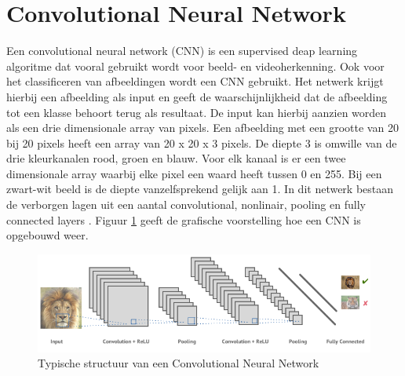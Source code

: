 \section{Convolutional Neural Network}
\label{sec:Convolutional Neural Network}

Een convolutional neural network (\acrshort{CNN}) is een supervised deap learning algoritme dat vooral gebruikt wordt voor beeld- en videoherkenning. Ook voor het classificeren van afbeeldingen wordt een CNN gebruikt. Het netwerk krijgt hierbij een afbeelding als input en geeft de waarschijnlijkheid dat de afbeelding tot een klasse behoort terug als resultaat. De input kan hierbij aanzien worden als een drie dimensionale array van pixels. Een afbeelding met een grootte van 20 bij 20 pixels heeft een array van 20 x 20 x 3 pixels. De diepte 3 is omwille van de drie kleurkanalen rood, groen en blauw. Voor elk kanaal is er een twee dimensionale array waarbij elke pixel een waard heeft tussen 0 en 255. Bij een zwart-wit beeld is de diepte vanzelfsprekend gelijk aan 1. In dit netwerk bestaan de verborgen lagen uit een aantal convolutional, nonlinair, pooling en fully connected layers \autocite{brohrer}. Figuur \ref{fig:structuur} geeft de grafische voorstelling hoe een CNN is opgebouwd weer.  
\begin{figure}
    \centering
        \includegraphics[width=1\textwidth]{img/convolutional_neural_network.png}
    \caption{Typische structuur van een Convolutional Neural Network \autocite{tejani}}
    \label{fig:structuur}
  \end{figure}

